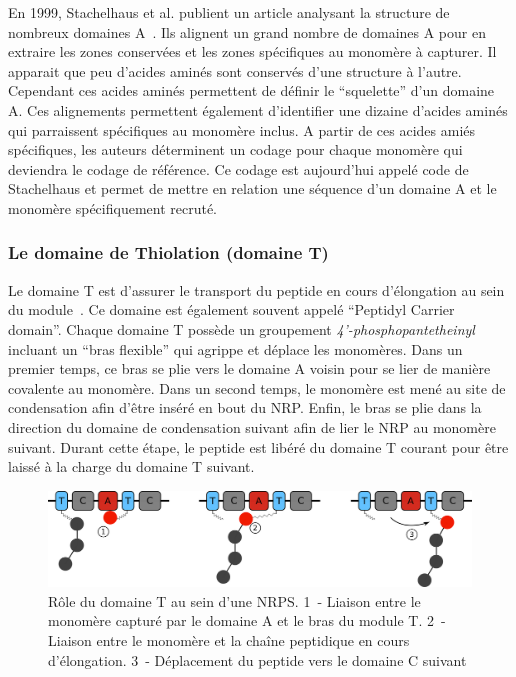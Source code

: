 En 1999, Stachelhaus et al. publient un article analysant la structure de nombreux domaines A~\cite{stachelhaus_specificity-conferring_1999}.
Ils alignent un grand nombre de domaines A pour en extraire les zones conservées et les zones spécifiques au monomère à capturer.
Il apparait que peu d'acides aminés sont conservés d'une structure à l'autre.
Cependant ces acides aminés permettent de définir le ``squelette'' d'un domaine A.
Ces alignements permettent également d'identifier une dizaine d'acides aminés qui parraissent spécifiques au monomère inclus.
A partir de ces acides amiés spécifiques, les auteurs déterminent un codage pour chaque monomère qui deviendra le codage de référence.
Ce codage est aujourd'hui appelé code de Stachelhaus et permet de mettre en relation une séquence d'un domaine A et le monomère spécifiquement recruté.


\subsubsection{Le domaine de Thiolation (domaine T)}

Le domaine T est d'assurer le transport du peptide en cours d'élongation au sein du module~\cite{stachelhaus_biochemical_1996,calcott_portability_2015}.
Ce domaine est également souvent appelé ``Peptidyl Carrier domain''.
Chaque domaine T possède un groupement \textit{4’-phosphopantetheinyl} incluant un ``bras flexible'' qui agrippe et déplace les monomères.
Dans un premier temps, ce bras se plie vers le domaine A voisin pour se lier de manière covalente au monomère.
Dans un second temps, le monomère est mené au site de condensation afin d'être inséré en bout du NRP.
Enfin, le bras se plie dans la direction du domaine de condensation suivant afin de lier le NRP au monomère suivant.
Durant cette étape, le peptide est libéré du domaine T courant pour être laissé à la charge du domaine T suivant.

\begin{figure}[h!]
  \begin{center}
    \includegraphics[width=450px]{Figures/bio/Intro/T-domain.png}
    \caption{\label{T_domain}Rôle du domaine T au sein d'une NRPS.
    1~- Liaison entre le monomère capturé par le domaine A et le bras du module T.
    2~- Liaison entre le monomère et la chaîne peptidique en cours d'élongation.
    3~- Déplacement du peptide vers le domaine C suivant}
  \end{center}
\end{figure}

